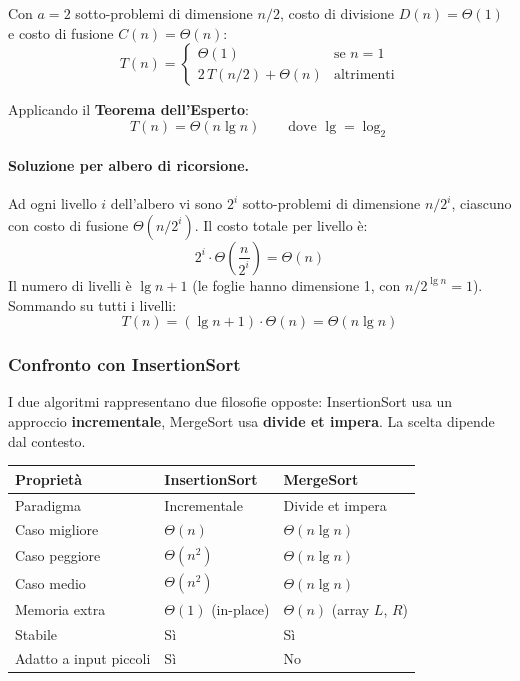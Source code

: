 Con $a = 2$ sotto-problemi di dimensione $n/2$, costo di divisione
$D(n) = \Theta(1)$ e costo di fusione $C(n) = \Theta(n)$:
\[
T(n) = \begin{cases}
	\Theta(1)                & \text{se } n = 1           \\[4pt]
	2\,T(n/2) + \Theta(n)   & \text{altrimenti}
\end{cases}
\]

Applicando il \textbf{Teorema dell'Esperto}:
\[
\boxed{T(n) = \Theta(n \lg n)} \qquad \text{dove } \lg = \log_2
\]

\paragraph{Soluzione per albero di ricorsione.}

\begin{center}
	\begin{nota}
		Ad ogni livello $i$ dell'albero vi sono $2^i$ sotto-problemi di
		dimensione $n/2^i$, ciascuno con costo di fusione $\Theta(n/2^i)$.
		Il costo totale per livello è:
		\[
		2^i \cdot \Theta\!\left(\frac{n}{2^i}\right) = \Theta(n)
		\]
		Il numero di livelli è $\lg n + 1$ (le foglie hanno dimensione 1,
		con $n/2^{\lg n} = 1$). Sommando su tutti i livelli:
		\[
		T(n) = (\lg n + 1) \cdot \Theta(n) = \Theta(n \lg n)
		\]
	\end{nota}
\end{center}

\subsubsection{Confronto con InsertionSort}

\begin{nota}
	I due algoritmi rappresentano due filosofie opposte:
	InsertionSort usa un approccio \textbf{incrementale}, MergeSort usa
	\textbf{divide et impera}. La scelta dipende dal contesto.
\end{nota}

\begin{center}
	\begin{tabular}{lll}
		\toprule
		\textbf{Proprietà}      & \textbf{InsertionSort}    & \textbf{MergeSort}        \\
		\midrule
		Paradigma               & Incrementale              & Divide et impera          \\
		Caso migliore           & $\Theta(n)$               & $\Theta(n \lg n)$         \\
		Caso peggiore           & $\Theta(n^2)$             & $\Theta(n \lg n)$         \\
		Caso medio              & $\Theta(n^2)$             & $\Theta(n \lg n)$         \\
		Memoria extra           & $\Theta(1)$ (in-place)    & $\Theta(n)$ (array $L$, $R$) \\
		Stabile                 & Sì                        & Sì                        \\
		Adatto a input piccoli  & Sì                        & No                        \\
		\bottomrule
	\end{tabular}
\end{center}


